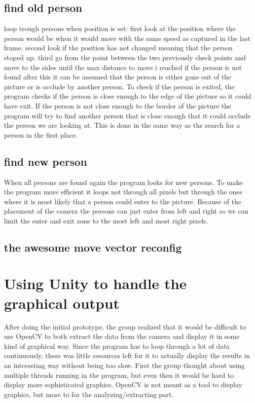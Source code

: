 \subsection{find old person}
loop trough persons
when position is set:
	first look at the position where the person would be when it would move with the same speed as captured in the last frame.
	second look if the position has not changed meaning that the person stoped up.
	third go from the point between the two previously check points and move to the sides until the max distance to move i reached
	if the person is not found after this it can be assumed that the person is either gone out of the picture or is occlude by another person. To check if the person is exited, the program checks if the person is close enough to the edge of the picture so it could have exit. If the person is not close enough to the border of the  picture the program will try to find another person that is close enough that it could occlude the person we are looking at.  This is done in the same way as the search for a person in the first place.
	
\subsection{find new person}

When all persons are found again the program looks for new persons. To make the program more efficient it loops not through all pixels but through the ones where it is most likely that a person could enter to the picture. Because of the placement of the camera the persons can just enter from left and right so we can limit the enter and exit zone to the most left and most right pixels. 

\subsection{the awesome move vector reconfig}

\section{Using Unity to handle the graphical output}
After doing the initial prototype, the group realized that it would be difficult to use OpenCV to both extract the data from the camera and display it in some kind of graphical way. Since the program has to loop through a lot of data continuously, there was little resources left for it to actually display the results in an interesting way without being too slow. First the group thought about using multiple threads running in the program, but even then it would be hard to display more sophisticated graphics. OpenCV is not meant as a tool to display graphics, but more to for the analyzing/extracting part.

